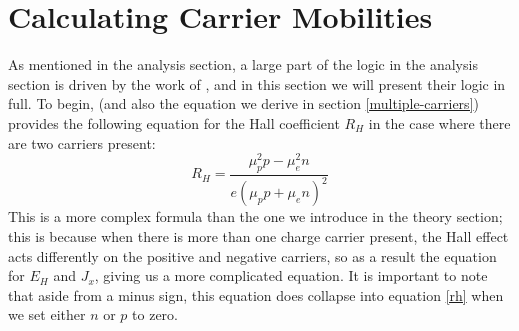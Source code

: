 \documentclass[10pt]{article}
\begin{document}
	\section{Calculating Carrier Mobilities}
	\label{B}
	As mentioned in the analysis section, a large part of the logic in the analysis section is driven by the
	work of \cite{melissinos}, and in this section we will present their logic in full. To begin,
	\cite{melissinos} (and also the
	equation we derive in section \ref{multiple-carriers}) provides the
	following equation for the Hall coefficient \( R_H \) in the case where there are two carriers present:
	\[
		R_H = \frac{\mu_p^2 p - \mu_e^2 n}{e(\mu_p p + \mu_e n)^2}
	\]
	This is a more complex formula than the one we introduce in the theory section; this is because when
	there is more than one charge carrier present, the Hall effect acts differently on the positive and
	negative carriers, so as a result the equation for \( E_H \) and \( J_x \), giving us a more complicated
	equation. It is important to note that aside from a minus sign, this equation does collapse into equation
	\ref{rh} when we set either \( n \) or \( p \) to zero. 
\end{document}
